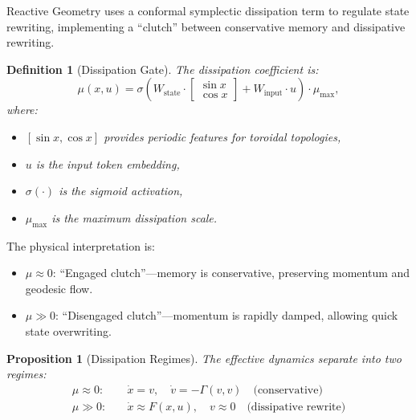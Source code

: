 \documentclass[12pt,letterpaper,twoside]{article}
\newtheorem{definition}{Definition}[section]
\newtheorem{prop}{Proposition}[section]
\begin{document}
Reactive Geometry uses a conformal symplectic dissipation term to regulate state rewriting, implementing a ``clutch'' between conservative memory and dissipative rewriting.

\begin{definition}[Dissipation Gate]
The dissipation coefficient is:
\[
\mu(x, u) = \sigma\!\left(W_{\text{state}} \cdot \begin{bmatrix}\sin x \\ \cos x\end{bmatrix} + W_{\text{input}} \cdot u\right) \cdot \mu_{\max},
\]
where:
\begin{itemize}
\item $[\sin x, \cos x]$ provides periodic features for toroidal topologies,
\item $u$ is the input token embedding,
\item $\sigma(\cdot)$ is the sigmoid activation,
\item $\mu_{\max}$ is the maximum dissipation scale.
\end{itemize}
\end{definition}

The physical interpretation is:
\begin{itemize}
\item $\mu \approx 0$: ``Engaged clutch''—memory is conservative, preserving momentum and geodesic flow.
\item $\mu \gg 0$: ``Disengaged clutch''—momentum is rapidly damped, allowing quick state overwriting.
\end{itemize}

\begin{prop}[Dissipation Regimes]
The effective dynamics separate into two regimes:
\begin{align}
\mu \approx 0: &\quad \dot{x} = v, \quad \dot{v} = -\Gamma(v,v) \quad \text{(conservative)} \\
\mu \gg 0: &\quad \dot{x} \approx F(x,u), \quad v \approx 0 \quad \text{(dissipative rewrite)}
\end{align}
\end{prop}
\end{document}
